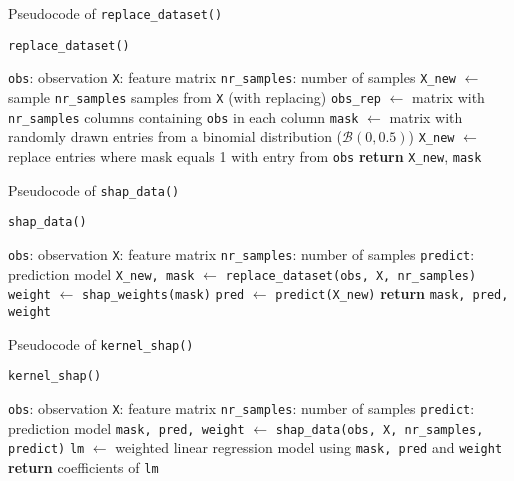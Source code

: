 {\begin{enumerate}[a)]
	Pseudocode of \texttt{replace\_dataset()}
	
	\begin{algorithm}[H]
		\caption{\texttt{replace\_dataset()}}
		\begin{algorithmic}[1]
			\Require \texttt{obs}: observation
			\Require \texttt{X}: feature matrix
			\Require \texttt{nr\_samples}: number of samples
			\State \texttt{X\_new} $\gets$ sample \texttt{nr\_samples} samples from \texttt{X} (with replacing)
			\State \texttt{obs\_rep} $\gets$ matrix with \texttt{nr\_samples} columns containing \texttt{obs} in each column
			\State \texttt{mask} $\gets$ matrix with randomly drawn entries from a binomial distribution ($\mathcal{B}(0, 0.5)$)
			\State \texttt{X\_new} $\gets$ replace entries where mask equals 1 with entry from \texttt{obs}
			\State \textbf{return} \texttt{X\_new}, \texttt{mask}
		\end{algorithmic}
	\end{algorithm}

	Pseudocode of \texttt{shap\_data()}
	
	\begin{algorithm}[H]
		\caption{\texttt{shap\_data()}}
		\begin{algorithmic}[1]
			\Require \texttt{obs}: observation
			\Require \texttt{X}: feature matrix
			\Require \texttt{nr\_samples}: number of samples
			\Require \texttt{predict}: prediction model
			\State \texttt{X\_new, mask} $\gets$ \texttt{replace\_dataset(obs, X, nr\_samples)}
			\State \texttt{weight} $\gets$ \texttt{shap\_weights(mask)}
			\State \texttt{pred} $\gets$ \texttt{predict(X\_new)}
			\State \textbf{return} \texttt{mask, pred, weight}
		\end{algorithmic}
	\end{algorithm}

	Pseudocode of \texttt{kernel\_shap()}
	
	\begin{algorithm}[H]
		\caption{\texttt{kernel\_shap()}}
		\begin{algorithmic}[1]
			\Require \texttt{obs}: observation
			\Require \texttt{X}: feature matrix
			\Require \texttt{nr\_samples}: number of samples
			\Require \texttt{predict}: prediction model
			\State \texttt{mask, pred, weight} $\gets$ \texttt{shap\_data(obs, X, nr\_samples, predict)}
			\State \texttt{lm} $\gets$ weighted linear regression model using \texttt{mask, pred} and \texttt{weight}
			\State \textbf{return} coefficients of \texttt{lm}
		\end{algorithmic}
	\end{algorithm}


\end{enumerate}}
